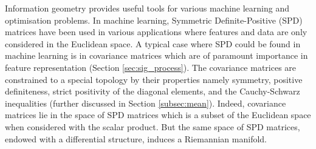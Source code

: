 

Information geometry provides useful tools for various machine learning and optimisation problems. 
In machine learning, Symmetric Definite-Positive (SPD)	 matrices %
 have been used in various applications where features and data  are only considered in the Euclidean space. %
A typical case where SPD could be found in machine learning is in covariance matrices which are of paramount importance in feature representation (Section \ref{sec:sig_process}).
The covariance matrices are constrained to a special topology by their properties namely symmetry, positive definiteness, strict positivity of the diagonal elements, and the Cauchy-Schwarz inequalities (further discussed in Section \ref{subsec:mean}).
Indeed, covariance matrices lie in the space of SPD matrices which is a subset of the Euclidean space when considered with the scalar product.
But the same space of SPD matrices, endowed with a differential structure, induces a Riemannian manifold.

